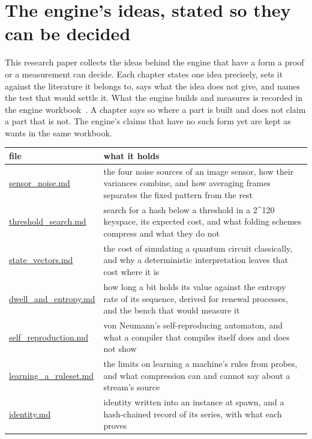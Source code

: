 \chapter{\texorpdfstring{The engine's ideas, stated so they can be decided}{The engine's ideas, stated so they can be decided}}
\label{chap:readme}

This research paper collects the ideas behind the engine that have a form a proof or a measurement can decide. Each chapter states one idea precisely, sets it against the literature it belongs to, says what the idea does not give, and names the test that would settle it. What the engine builds and measures is recorded in the engine workbook~\cite{src:Quigg-engine-workbook}. A chapter says so where a part is built and does not claim a part that is not. The engine's claims that have no such form yet are kept as wants in the same workbook.

{\small
\setlength{\tabcolsep}{6pt}
\begin{longtable}{>{\RaggedRight\arraybackslash}p{}>{\RaggedRight\arraybackslash}p{}}
\toprule
file & what it holds \\
\midrule
\endhead
\hyperref[chap:sensor-noise]{sensor\_\allowbreak{}noise.md} & the four noise sources of an image sensor, how their variances combine, and how averaging frames separates the fixed pattern from the rest \\
\hyperref[chap:threshold-search]{threshold\_\allowbreak{}search.md} & search for a hash below a threshold in a 2\textasciicircum{}120 keyspace, its expected cost, and what folding schemes compress and what they do not \\
\hyperref[chap:state-vectors]{state\_\allowbreak{}vectors.md} & the cost of simulating a quantum circuit classically, and why a deterministic interpretation leaves that cost where it is \\
\hyperref[chap:dwell-and-entropy]{dwell\_\allowbreak{}and\_\allowbreak{}entropy.md} & how long a bit holds its value against the entropy rate of its sequence, derived for renewal processes, and the bench that would measure it \\
\hyperref[chap:self-reproduction]{self\_\allowbreak{}reproduction.md} & von Neumann's self-reproducing automaton, and what a compiler that compiles itself does and does not show \\
\hyperref[chap:learning-a-ruleset]{learning\_\allowbreak{}a\_\allowbreak{}ruleset.md} & the limits on learning a machine's rules from probes, and what compression can and cannot say about a stream's source \\
\hyperref[chap:identity]{identity.md} & identity written into an instance at spawn, and a hash-chained record of its series, with what each proves \\
\bottomrule
\end{longtable}
}

